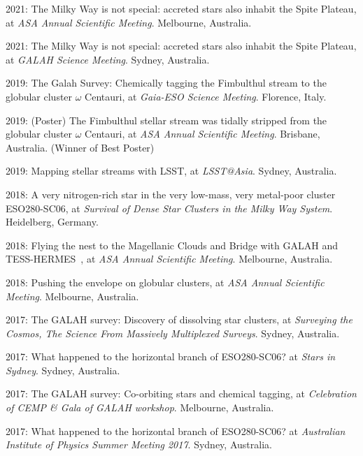 \item[{\color{numcolor}\scriptsize19}] 2021: The Milky Way is not special: accreted stars also inhabit the Spite Plateau, at \textit{ASA Annual Scientific Meeting}. Melbourne, Australia.
\item[{\color{numcolor}\scriptsize18}] 2021: The Milky Way is not special: accreted stars also inhabit the Spite Plateau, at \textit{GALAH Science Meeting}. Sydney, Australia.
\item[{\color{numcolor}\scriptsize17}] 2019: The Galah Survey: Chemically tagging the Fimbulthul stream to the globular cluster $\omega$ Centauri, at \textit{Gaia-ESO Science Meeting}. Florence, Italy.
\item[{\color{numcolor}\scriptsize16}] 2019: (Poster) The Fimbulthul stellar stream was tidally stripped from the globular cluster $\omega$ Centauri, at \textit{ASA Annual Scientific Meeting}. Brisbane, Australia. (Winner of Best Poster)
\item[{\color{numcolor}\scriptsize15}] 2019: Mapping stellar streams with LSST, at \textit{LSST@Asia}. Sydney, Australia.
\item[{\color{numcolor}\scriptsize14}] 2018: A very nitrogen-rich star in the very low-mass, very metal-poor cluster ESO280-SC06, at \textit{Survival of Dense Star Clusters in the Milky Way System}. Heidelberg, Germany.
\item[{\color{numcolor}\scriptsize13}] 2018: Flying the nest to the Magellanic Clouds and Bridge with GALAH and TESS-HERMES~, at \textit{ASA Annual Scientific Meeting}. Melbourne, Australia.
\item[{\color{numcolor}\scriptsize12}] 2018: Pushing the envelope on globular clusters, at  \textit{ASA Annual Scientific Meeting}. Melbourne, Australia.
\item[{\color{numcolor}\scriptsize11}] 2017: The GALAH survey: Discovery of dissolving star clusters, at  \textit{Surveying the Cosmos, The Science From Massively Multiplexed Surveys}. Sydney, Australia.
\item[{\color{numcolor}\scriptsize10}] 2017: What happened to the horizontal branch of ESO280-SC06? at \textit{Stars in Sydney}. Sydney, Australia.
\item[{\color{numcolor}\scriptsize9}] 2017: The GALAH survey: Co-orbiting stars and chemical tagging, at  \textit{Celebration of CEMP \& Gala of GALAH workshop}. Melbourne, Australia.
\item[{\color{numcolor}\scriptsize8}] 2017: What happened to the horizontal branch of ESO280-SC06? at \textit{Australian Institute of Physics Summer Meeting 2017}. Sydney, Australia.
